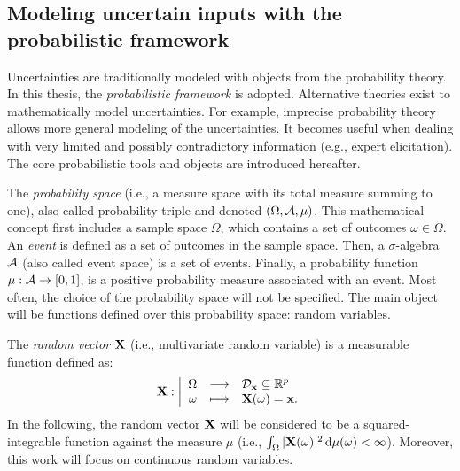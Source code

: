 \subsection{Modeling uncertain inputs with the probabilistic framework}

Uncertainties are traditionally modeled with objects from the probability theory.
In this thesis, the \textit{probabilistic framework} is adopted. 
Alternative theories exist to mathematically model uncertainties. 
For example, imprecise probability theory allows more general modeling of the uncertainties. 
It becomes useful when dealing with very limited and possibly contradictory information (e.g., expert elicitation). 
The core probabilistic tools and objects are introduced hereafter. 

The \textit{probability space} (i.e., a measure space with its total measure summing to one), also called probability triple and denoted $(\Omega, \mathcal{A}, \mu)$.
This mathematical concept first includes a sample space $\Omega$, which contains a set of outcomes $\omega \in \Omega$. 
An \textit{event} is defined as a set of outcomes in the sample space.
Then, a $\sigma$-algebra $\mathcal{A}$ (also called event space) is a set of events. 
Finally, a probability function $\mu: \mathcal{A} \rightarrow [0, 1]$, is a positive probability measure associated with an event.
Most often, the choice of the probability space will not be specified. 
The main object will be functions defined over this probability space: random variables. 

The \textit{random vector} ${\bf X}$ (i.e., multivariate random variable) is a measurable function defined as: 
\begin{equation}
{\bf X} : \bigg|
\begin{array}{rcl}
    \Omega & \longrightarrow & \mathcal{D}_{{\bf x}} \subseteq \mathbb{R}^p\\
    \omega & \longmapsto & {\bf X}(\omega) = {\bf x}.
\end{array}
\end{equation}
In the following, the random vector ${\bf X}$ will be considered to be a squared-integrable function against the measure $\mu$ (i.e., $\int_{\Omega} |{\bf X}(\omega)|^2 \,\mathrm{d} \mu(\omega) < \infty$).
Moreover, this work will focus on continuous random variables.

